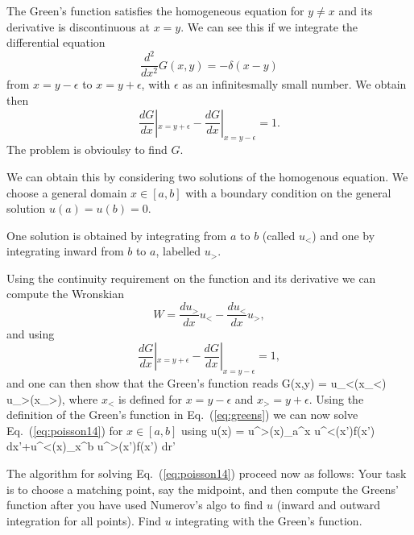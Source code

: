 The Green's function satisfies the homogeneous equation for $y\ne x$ and its 
derivative is discontinuous at $x=y$.
We can see this  if we integrate   the differential equation
\[
\frac{d^2}{dx^2} G(x,y) = -\delta(x-y)
\]
from $x=y-\epsilon$ to $x=y+\epsilon$, with $\epsilon$ as an infinitesmally small number. 
We obtain then 
\[
\frac{dG}{dx}|_{x=y+\epsilon}-\frac{dG}{dx}|_{x=y-\epsilon}=1.
\]
The problem is obvioulsy to find $G$.

We can obtain this by considering two solutions of the homogenous equation. 
We choose a general domain  
$x\in [a,b]$ with a boundary condition on the general solution $u(a)=u(b)=0$. 

One solution is obtained by integrating from  $a$ to $b$  (called $u_<$) 
and  one by integrating inward from
$b$ to $a$, labelled $u_>$.  

Using the continuity requirement on the function and its derivative 
we can compute the Wronskian \cite{arfken1985,tveito2002}
\[
W=\frac{du_>}{dx}u_< - \frac{du_<}{dx}u_>,
\]
and using
\[
\frac{dG}{dx}|_{x=y+\epsilon}-\frac{dG}{dx}|_{x=y-\epsilon}=1,
\]
and one can then show that the Green's function reads
\be \label{eq:greens}
G(x,y) = u_<(x_<) u_>(x_>),
\ee
where
$x_<$ is defined for $x=y-\epsilon$ and $x_>=y+\epsilon$. 
Using the definition of the Green's function in Eq.~(\ref{eq:greens}) we can now solve 
Eq.~(\ref{eq:poisson14}) for $x\in [a,b]$ using
\be \label{eq:finalu14}
u(x) = u^{>}(x)\int_a^{x} u^{<}(x')f(x') dx'+u^{<}(x)\int_x^{b} u^{>}(x')f(x') dr'
\ee

The algorithm for solving Eq.~(\ref{eq:poisson14}) proceed now as follows:
Your task is to choose a matching point, say the midpoint, and then compute the Greens' function
after you have used Numerov's algo to find $u$  (inward and outward integration for all points). 
Find $u$ integrating with the Green's function.

